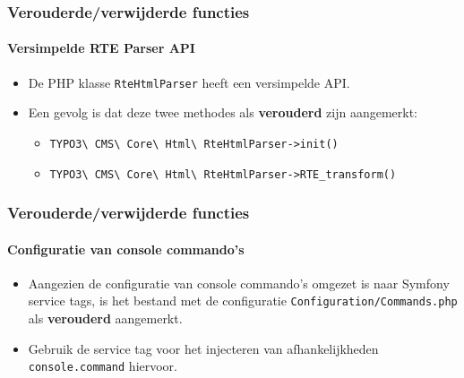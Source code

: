 
\begin{frame}[fragile]
	\frametitle{Verouderde/verwijderde functies}
	\framesubtitle{Versimpelde RTE Parser API}

	\begin{itemize}
		\item De PHP klasse \texttt{RteHtmlParser} heeft een versimpelde API.
		\item Een gevolg is dat deze twee methodes als \textbf{verouderd} zijn aangemerkt:

			\begin{itemize}
				\item \texttt{TYPO3\textbackslash
					CMS\textbackslash
					Core\textbackslash
					Html\textbackslash
					RteHtmlParser->init()}
				\item \texttt{TYPO3\textbackslash
					CMS\textbackslash
					Core\textbackslash
					Html\textbackslash
					RteHtmlParser->RTE\_transform()}
			\end{itemize}

	\end{itemize}

\end{frame}


\begin{frame}[fragile]
	\frametitle{Verouderde/verwijderde functies}
	\framesubtitle{Configuratie van console commando's}

	\begin{itemize}
		\item Aangezien de configuratie van console commando's omgezet is naar Symfony service tags,
			is het bestand met de configuratie \texttt{Configuration/Commands.php} als
			\textbf{verouderd} aangemerkt.
		\item Gebruik de service tag voor het injecteren van afhankelijkheden \texttt{console.command} hiervoor.

	\end{itemize}

\end{frame}


